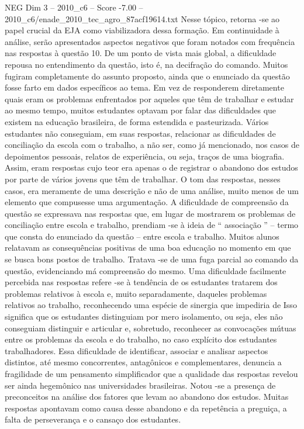 \begin{textsample}{NEG Dim 3 – 2010\_c6 – Score -7.00 – 2010\_c6/enade\_2010\_tec\_agro\_87acf19614.txt}
Nesse tópico, retorna -se ao papel crucial da EJA como viabilizadora dessa formação.
Em continuidade à análise, serão apresentados aspectos negativos que foram notados com frequência nas respostas à questão 10.
De um ponto de vista mais global, a dificuldade repousa no entendimento da questão, isto é, na decifração do comando.
Muitos fugiram completamente do assunto proposto, ainda que o enunciado da questão fosse farto em dados específicos ao tema.
Em vez de responderem diretamente quais eram os problemas enfrentados por aqueles que têm de trabalhar e estudar ao mesmo tempo, muitos estudantes optavam por falar das dificuldades que existem na educação brasileira, de forma estendida e pasteurizada.
Vários estudantes não conseguiam, em suas respostas, relacionar as dificuldades de conciliação da escola com o trabalho, a não ser, como já mencionado, nos casos de depoimentos pessoais, relatos de experiência, ou seja, traços de uma biografia.
Assim, eram respostas cujo teor era apenas o de registrar o abandono dos estudos por parte de vários jovens que têm de trabalhar.
O tom das respostas, nesses casos, era meramente de uma descrição e não de uma análise, muito menos de um elemento que compusesse uma argumentação.
A dificuldade de compreensão da questão se expressava nas respostas que, em lugar de mostrarem os problemas de conciliação entre escola e trabalho, prendiam -se à ideia de “ associação ” – termo que consta do enunciado da questão – entre escola e trabalho.
Muitos alunos relatavam as consequências positivas de uma boa educação no momento em que se busca bons postos de trabalho.
Tratava -se de uma fuga parcial ao comando da questão, evidenciando má compreensão do mesmo.
Uma dificuldade facilmente percebida nas respostas refere -se à tendência de os estudantes tratarem dos problemas relativos à escola e, muito separadamente, daqueles problemas relativos ao trabalho, reconhecendo uma espécie de sinergia que impediria de Isso significa que os estudantes distinguiam por mero isolamento, ou seja, eles não conseguiam distinguir e articular e, sobretudo, reconhecer as convocações mútuas entre os problemas da escola e do trabalho, no caso explícito dos estudantes trabalhadores.
Essa dificuldade de identificar, associar e analisar aspectos distintos, até mesmo concorrentes, antagônicos e complementares, denuncia a fragilidade de um pensamento simplificador que a qualidade das respostas revelou ser ainda hegemônico nas universidades brasileiras.
Notou -se a presença de preconceitos na análise dos fatores que levam ao abandono dos estudos.
Muitas respostas apontavam como causa desse abandono e da repetência a preguiça, a falta de perseverança e o cansaço dos estudantes.

\end{textsample}
